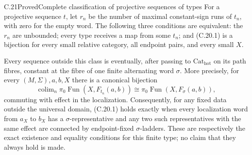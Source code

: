 \begin{claim}{C.21}{Proved}{Complete classification of projective sequences of types}
For a projective sequence $t$, let $r_n$ be the number of maximal
constant-sign runs of $t_n$, with zero for the empty word. The
following three conditions are equivalent: the $r_n$ are unbounded;
every type receives a map from some $t_n$; and (C.20.1) is a
bijection for every small relative category, all endpoint pairs,
and every small $X$.

Every sequence outside this class is eventually, after passing to
$\mathrm{Cat}_{\mathrm{hot}}$ on its path fibres, constant at the
fibre of one finite alternating word $\sigma$. More precisely,
for every $(M,\Sigma),a,b,X$ there is a canonical bijection
\[
 \operatorname{colim}_n\pi_0\operatorname{Fun}(X,F_{t_n}(a,b))
      \cong\pi_0\operatorname{Fun}(X,F_\sigma(a,b)),        \tag{C.21.1}
\]
commuting with effect in the localization. Consequently, for any
fixed data outside the universal domain, (C.20.1) holds exactly
when every localization word from $a_X$ to $b_X$ has a
$\sigma$-representative and any two such representatives with
the same effect are connected by endpoint-fixed $\sigma$-ladders.
These are respectively the exact existence and equality conditions
for this finite type; no claim that they always hold is made.
\end{claim}
